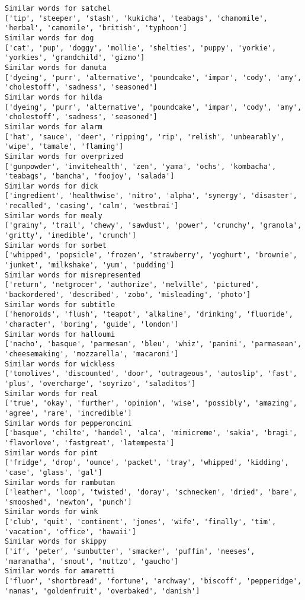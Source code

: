 \documentclass[11pt]{article}
\begin{document}
\begin{Verbatim}[commandchars=\\\{\}]
Similar words for satchel
['tip', 'steeper', 'stash', 'kukicha', 'teabags', 'chamomile', 'herbal', 'camomile', 'british', 'typhoon']
Similar words for dog
['cat', 'pup', 'doggy', 'mollie', 'shelties', 'puppy', 'yorkie', 'yorkies', 'grandchild', 'gizmo']
Similar words for danuta
['dyeing', 'purr', 'alternative', 'poundcake', 'impar', 'cody', 'amy', 'cholestoff', 'sadness', 'seasoned']
Similar words for hilda
['dyeing', 'purr', 'alternative', 'poundcake', 'impar', 'cody', 'amy', 'cholestoff', 'sadness', 'seasoned']
Similar words for alarm
['hat', 'sauce', 'deer', 'ripping', 'rip', 'relish', 'unbearably', 'wipe', 'tamale', 'flaming']
Similar words for overprized
['gunpowder', 'invitehealth', 'zen', 'yama', 'ochs', 'kombacha', 'teabags', 'bancha', 'foojoy', 'salada']
Similar words for dick
['ingredient', 'healthwise', 'nitro', 'alpha', 'synergy', 'disaster', 'recalled', 'casing', 'calm', 'westbrai']
Similar words for mealy
['grainy', 'trail', 'chewy', 'sawdust', 'power', 'crunchy', 'granola', 'gritty', 'inedible', 'crunch']
Similar words for sorbet
['whipped', 'popsicle', 'frozen', 'strawberry', 'yoghurt', 'brownie', 'junket', 'milkshake', 'yum', 'pudding']
Similar words for misrepresented
['return', 'netgrocer', 'authorize', 'melville', 'pictured', 'backordered', 'described', 'zobo', 'misleading', 'photo']
Similar words for subtitle
['hemoroids', 'flush', 'teapot', 'alkaline', 'drinking', 'fluoride', 'character', 'boring', 'guide', 'london']
Similar words for halloumi
['nacho', 'basque', 'parmesan', 'bleu', 'whiz', 'panini', 'parmasean', 'cheesemaking', 'mozzarella', 'macaroni']
Similar words for wickless
['tomolives', 'discounted', 'door', 'outrageous', 'autoslip', 'fast', 'plus', 'overcharge', 'soyrizo', 'saladitos']
Similar words for real
['true', 'okay', 'further', 'opinion', 'wise', 'possibly', 'amazing', 'agree', 'rare', 'incredible']
Similar words for pepperoncini
['basque', 'chilte', 'handel', 'alca', 'mimicreme', 'sakia', 'bragi', 'flavorlove', 'fastgreat', 'latempesta']
Similar words for pint
['fridge', 'drop', 'ounce', 'packet', 'tray', 'whipped', 'kidding', 'case', 'glass', 'gal']
Similar words for rambutan
['leather', 'loop', 'twisted', 'doray', 'schnecken', 'dried', 'bare', 'smooshed', 'newton', 'punch']
Similar words for wink
['club', 'quit', 'continent', 'jones', 'wife', 'finally', 'tim', 'vacation', 'office', 'hawaii']
Similar words for skippy
['if', 'peter', 'sunbutter', 'smacker', 'puffin', 'neeses', 'maranatha', 'snout', 'nuttzo', 'gaucho']
Similar words for amaretti
['fluor', 'shortbread', 'fortune', 'archway', 'biscoff', 'pepperidge', 'nanas', 'goldenfruit', 'overbaked', 'danish']

\end{Verbatim}
\end{document}
